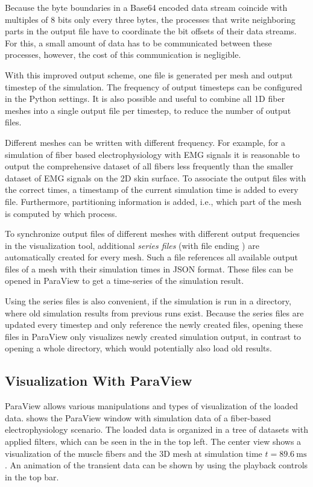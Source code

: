 Because the byte boundaries in a Base64 encoded data stream coincide with multiples of 8 bits only every three bytes, the processes that write neighboring parts in the output file have to coordinate the bit offsets of their data streams. For this, a small amount of data has to be communicated between these processes, however, the cost of this communication is negligible.

With this improved output scheme, one file is generated per mesh and output timestep of the simulation. The frequency of output timesteps can be configured in the Python settings.
It is also possible and useful to combine all 1D fiber meshes into a single output file per timestep, to reduce the number of output files.

Different meshes can be written with different frequency. For example, for a simulation of fiber based electrophysiology with EMG signals it is reasonable to output the comprehensive dataset of all fibers less frequently than the smaller dataset of EMG signals on the 2D skin surface. To associate the output files with the correct times, a timestamp of the current simulation time is added to every file. Furthermore, partitioning information is added, i.e., which part of the mesh is computed by which process.

To synchronize output files of different meshes with different output frequencies in the visualization tool, additional \emph{series files} (with file ending ) are automatically created for every mesh. Such a file references all available output files of a mesh with their simulation times in JSON format. These files can be opened in ParaView to get a time-series of the simulation result.

Using the series files is also convenient, if the simulation is run in a directory, where old simulation results from previous runs exist. Because the series files are updated every timestep and only reference the newly created files, opening these files in ParaView only visualizes newly created simulation output, in contrast to opening a whole directory, which would potentially also load old results.

\subsection{Visualization With ParaView}
ParaView allows various manipulations and types of visualization of the loaded data.  shows the ParaView window with simulation data of a fiber-based electrophysiology scenario. The loaded data is organized in a tree of datasets with applied filters, which can be seen in the  in the top left. The center view shows a visualization of the muscle fibers and the 3D mesh at simulation time $t=\SI{89.6}{\milli\second}$. An animation of the transient data can be shown by using the playback controls in the top bar.

